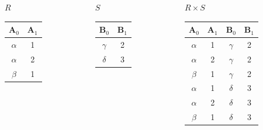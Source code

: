 \documentclass[11pt]{beamer}
\begin{document}
  \begin{frame}
    \begin{columns}[T]
      \begin{column}{0.25\textwidth}
        \centering $R$
        \medskip \\
        \begin{tabular}{|c|c|}
          \hline
          $\textbf{A}_0$ & $\textbf{A}_1$ \\[0.5ex] \hline\hline
          $\alpha$ & 1 \\ \hline
          $\alpha$ & 2 \\ \hline
          $\beta$ & 1 \\ \hline
        \end{tabular}
      \end{column}
      \begin{column}{0.25\textwidth}
        \centering $S$
        \medskip \\
        \begin{tabular}{|c|c|}
          \hline
          $\textbf{B}_0$ & $\textbf{B}_1$ \\[0.5ex] \hline\hline
          $\gamma$ & 2 \\ \hline
          $\delta$ & 3 \\ \hline
        \end{tabular}
      \end{column}
      \begin{column}{0.4\textwidth}
        \centering $R \times S$
        \medskip \\
        \begin{tabular}{|c|c|c|c|}
          \hline
          $\textbf{A}_0$ & $\textbf{A}_1$ & $\textbf{B}_0$ & $\textbf{B}_1$\\[0.5ex] \hline\hline
          $\alpha$ & 1 & $\gamma$ & 2 \\ \hline
          $\alpha$ & 2 & $\gamma$ & 2 \\ \hline
          $\beta$ & 1 & $\gamma$ & 2 \\ \hline
          $\alpha$ & 1 & $\delta$ & 3 \\ \hline
          $\alpha$ & 2 & $\delta$ & 3\\ \hline
          $\beta$ & 1 & $\delta$ & 3\\ \hline
        \end{tabular}
      \end{column}
    \end{columns}
  \end{frame}
\end{document}

